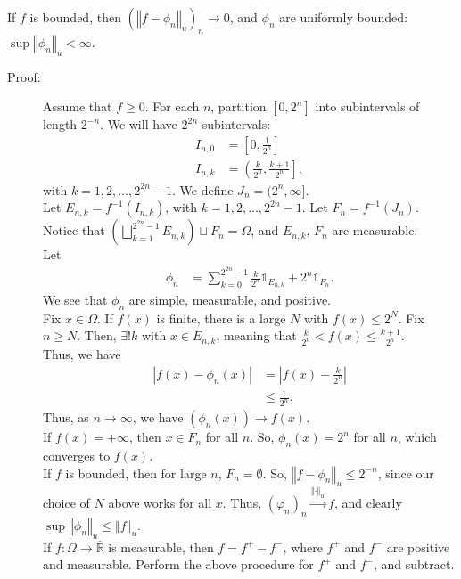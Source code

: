 \documentclass[9pt]{extarticle}
\newcommand{\R}{\mathbb{R}}
\newcommand{\norm}[1]{\left\Vert #1 \right\Vert}
\begin{document}
  If $f$ is bounded, then $\left(\norm{f-\phi_n}_u\right)_n \rightarrow 0$, and $\phi_n$ are uniformly bounded: $\sup \norm{\phi_n}_u < \infty$.
  \begin{description}
    \item[Proof:] Assume that $f \geq 0$. For each $n$, partition $[0,2^n]$ into subintervals of length $2^{-n}$. We will have $2^{2n}$ subintervals:
      \begin{align*}
        I_{n,0} &= \left[0,\frac{1}{2^n}\right]\\
        I_{n,k} &= \left(\frac{k}{2^n},\frac{k+1}{2^n}\right],
      \end{align*}
      with $k = 1,2,\dots,2^{2n}-1$. We define $J_n = (2^n,\infty]$.\\

      Let $E_{n,k} = f^{-1}(I_{n,k})$, with $k = 1,2,\dots,2^{2n}-1$. Let $F_n = f^{-1}(J_n)$.\\

      Notice that $\displaystyle \left(\bigsqcup_{k=1}^{2^{2n}-1} E_{n,k}\right) \sqcup F_n = \Omega$, and $E_{n,k}$, $F_n$ are measurable.\\

      Let
      \begin{align*}
        \phi_n &= \sum_{k=0}^{2^{2n}-1} \frac{k}{2^n}\mathbb{1}_{E_{n,k}} + 2^n \mathbb{1}_{F_n}.
      \end{align*}
      We see that $\phi_n$ are simple, measurable, and positive.\\

      Fix $x \in \Omega$. If $f(x)$ is finite, there is a large $N$ with $f(x) \leq 2^N$. Fix $n\geq N$. Then, $\exists ! k$ with $x\in E_{n,k}$, meaning that $\frac{k}{2^n} < f(x) \leq \frac{k+1}{2^n}$.\\

      Thus, we have
      \begin{align*}
        |f(x) - \phi_n(x)| &= \left|f(x) - \frac{k}{2^n}\right|\\
                           &\leq \frac{1}{2^n}.
      \end{align*}
      Thus, as $n\rightarrow \infty$, we have $\left(\phi_n(x)\right) \rightarrow f(x)$.\\

      If $f(x) = +\infty$, then $x\in F_n$ for all $n$. So, $\phi_n(x) = 2^n$ for all $n$, which converges to $f(x)$.\\

      If $f$ is bounded, then for large $n$, $F_n = \emptyset$. So, $\norm{f-\phi_n}_u \leq 2^{-n}$, since our choice of $N$ above works for all $x$. Thus, $(\varphi_n)_n \xrightarrow{\norm{\cdot}_u}f$, and clearly $\sup\norm{\phi_n}_u \leq \norm{f}_u$.\\

      If $f: \Omega \rightarrow \overline{\R}$ is measurable, then $f = f^{+} - f^{-}$, where $f^{+}$ and $f^{-}$ are positive and measurable. Perform the above procedure for $f^{+}$ and $f^{-}$, and subtract.
  \end{description}
\end{document}
